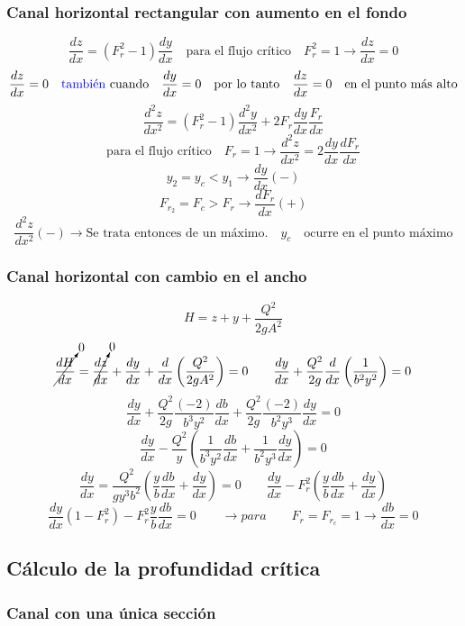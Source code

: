 \documentclass[a4paper, 11pt]{article}
\begin{document}
\subsubsection{Canal horizontal rectangular con aumento en el fondo}

$$\dfrac{dz}{dx}=(F^{2}_{r}-1)\dfrac{dy}{dx} \quad \text{para el flujo crítico} \quad F^{2}_{r}=1\rightarrow\dfrac{dz}{dx}=0$$
$$\dfrac{dz}{dx}=0 \quad \text{\textcolor{blue}{también} cuando} \quad\dfrac{dy}{dx}=0 \quad \text{por lo tanto} \quad \dfrac{dz}{dx}=0 \quad \text{en el punto más alto}$$
$$\dfrac{d^{2}z}{dx^{2}}=(F^{2}_{r}-1)\dfrac{d^{2}y}{dx^{2}}+2F_{r}\dfrac{dy}{dx}\dfrac{F_{r}}{dx}$$
$$\text{para el flujo crítico} \quad F_{r}=1\rightarrow\dfrac{d^{2}z}{dx^{2}}=2\dfrac{dy}{dx}\dfrac{dF_{r}}{dx}$$
$$y_{2}=y_{c}<y_{1}\rightarrow \dfrac{dy}{dx} (-)$$
$$F_{r_{2}}=F_{c}>F_{r}\rightarrow \dfrac{dF_{r}}{dx} (+)$$
$$\dfrac{d^{2}z}{dx^{2}}(-) \rightarrow \text{Se trata entonces de un máximo.} \quad y_c \quad\text{ocurre en el punto máximo} $$

\subsubsection{Canal horizontal con cambio en el ancho}
$$H=z+y+\dfrac{Q^{2}}{2gA^{2}}$$
$$\cancelto{0}{\dfrac{dH}{dx}}=\cancelto{0}{\dfrac{dz}{dx}}+\dfrac{dy}{dx}+\dfrac{d}{dx}\left(\dfrac{Q^{2}}{2gA^{2}}\right)=0 \qquad \dfrac{dy}{dx}+\dfrac{Q^{2}}{2g}\dfrac{d}{dx}\left(\dfrac{1}{b^{2}y^{2}}\right)=0$$
$$\dfrac{dy}{dx}+\dfrac{Q^{2}}{2g}\dfrac{(-2)}{b^{3}y^{2}}\dfrac{db}{dx}+\dfrac{Q^{2}}{2g}\dfrac{(-2)}{b^{2}y^{3}}\dfrac{dy}{dx}=0$$
$$\dfrac{dy}{dx}-\dfrac{Q^{2}}{y}\left(\dfrac{1}{b^{3}y^{2}}\dfrac{db}{dx}+\dfrac{1}{b^{2}y^{3}}\dfrac{dy}{dx}\right)=0$$
$$\dfrac{dy}{dx}=\dfrac{Q^{2}}{gy^{3}b^{2}}\left(\dfrac{y}{b}\dfrac{db}{dx}+\dfrac{dy}{dx}\right)=0 \qquad \dfrac{dy}{dx}-F^{2}_{r}\left(\dfrac{y}{b}\dfrac{db}{dx}+\dfrac{dy}{dx}\right)$$
$$\dfrac{dy}{dx}(1-F^{2}_{r})-F^{2}_{r}\dfrac{y}{b}\dfrac{db}{dx}=0 \qquad  \rightarrow para \qquad F_{r}=F_{r_{c}}=1\rightarrow\dfrac{db}{dx}=0$$

\subsection{Cálculo de la profundidad crítica}

\subsubsection{Canal con una única sección}
\end{document}
